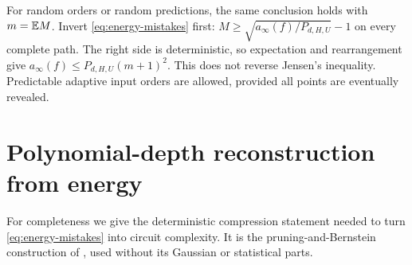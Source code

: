 \documentclass[11pt]{article}
\theoremstyle{remark}\newtheorem{remark}[theorem]{Remark}
\begin{document}
For random orders or random predictions, the same conclusion holds with
$m=\mathbb E M$. Invert \eqref{eq:energy-mistakes} first:
$M\ge\sqrt{a_\infty(f)/P_{d,H,U}}-1$ on every complete path.
The right side is deterministic, so expectation and rearrangement give
$a_\infty(f)\le P_{d,H,U}(m+1)^2$. This does not reverse Jensen's
inequality. Predictable adaptive input orders are allowed, provided all
points are eventually revealed.

\section{Polynomial-depth reconstruction from energy}
For completeness we give the deterministic compression statement needed
to turn \eqref{eq:energy-mistakes} into circuit complexity. It is the
pruning-and-Bernstein construction of \cite{quartic}, used without its
Gaussian or statistical parts.
\end{document}

